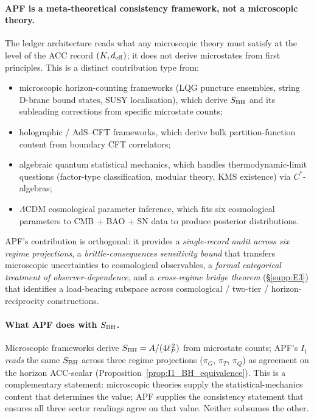 \documentclass[11pt]{article}
\theoremstyle{plain}
\theoremstyle{definition}
\theoremstyle{remark}
\begin{document}
\paragraph{APF is a meta-theoretical consistency framework, not a microscopic theory.}  The ledger architecture reads what any microscopic theory must satisfy at the level of the ACC record $(K, d_{\rm eff})$; it does not derive microstates from first principles.  This is a distinct contribution type from:
\begin{itemize}[leftmargin=2em,itemsep=2pt]
  \item microscopic horizon-counting frameworks (LQG puncture ensembles, string D-brane bound states, SUSY localisation), which derive $S_{\rm BH}$ and its subleading corrections from specific microstate counts;
  \item holographic / AdS--CFT frameworks, which derive bulk partition-function content from boundary CFT correlators;
  \item algebraic quantum statistical mechanics, which handles thermodynamic-limit questions (factor-type classification, modular theory, KMS existence) via $C^*$-algebras;
  \item $\Lambda$CDM cosmological parameter inference, which fits six cosmological parameters to CMB + BAO + SN data to produce posterior distributions.
\end{itemize}
APF's contribution is orthogonal: it provides a \emph{single-record audit across six regime projections}, a \emph{brittle-consequences sensitivity bound} that transfers microscopic uncertainties to cosmological observables, a \emph{formal categorical treatment of observer-dependence}, and a \emph{cross-regime bridge theorem} (\S\ref{supp:E3}) that identifies a load-bearing subspace across cosmological / two-tier / horizon-reciprocity constructions.

\paragraph{What APF does with $S_{\rm BH}$.}  Microscopic frameworks derive $S_{\rm BH} = A/(4\ell_P^{\,2})$ from microstate counts; APF's $I_1$ \emph{reads} the same $S_{\rm BH}$ across three regime projections ($\pi_G$, $\pi_T$, $\pi_Q$) as agreement on the horizon ACC-scalar (Proposition~\ref{prop:I1_BH_equivalence}).  This is a complementary statement: microscopic theories supply the statistical-mechanics content that determines the value; APF supplies the consistency statement that ensures all three sector readings agree on that value.  Neither subsumes the other.
\end{document}
